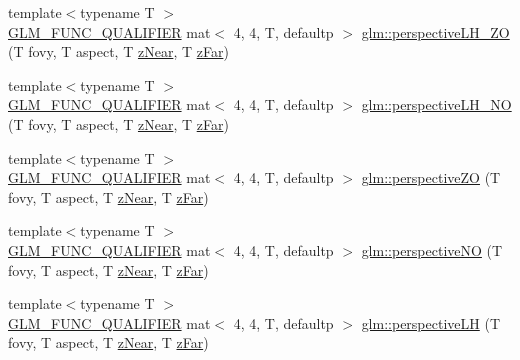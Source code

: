 \begin{DoxyCompactItemize}
\item 
{\footnotesize template$<$typename T $>$ }\\\mbox{\hyperlink{setup_8hpp_a33fdea6f91c5f834105f7415e2a64407}{G\+L\+M\+\_\+\+F\+U\+N\+C\+\_\+\+Q\+U\+A\+L\+I\+F\+I\+ER}} mat$<$ 4, 4, T, defaultp $>$ \mbox{\hyperlink{group__gtc__matrix__transform_gaca32af88c2719005c02817ad1142986c}{glm\+::perspective\+L\+H\+\_\+\+ZO}} (T fovy, T aspect, T \mbox{\hyperlink{_s_d_l__opengl__glext_8h_a12d99226e590bbaaf0be69169eeb4834}{z\+Near}}, T \mbox{\hyperlink{_s_d_l__opengl__glext_8h_a1052a8235df129542aea6da80fbec6a1}{z\+Far}})
\item 
{\footnotesize template$<$typename T $>$ }\\\mbox{\hyperlink{setup_8hpp_a33fdea6f91c5f834105f7415e2a64407}{G\+L\+M\+\_\+\+F\+U\+N\+C\+\_\+\+Q\+U\+A\+L\+I\+F\+I\+ER}} mat$<$ 4, 4, T, defaultp $>$ \mbox{\hyperlink{group__gtc__matrix__transform_gaead4d049d1feab463b700b5641aa590e}{glm\+::perspective\+L\+H\+\_\+\+NO}} (T fovy, T aspect, T \mbox{\hyperlink{_s_d_l__opengl__glext_8h_a12d99226e590bbaaf0be69169eeb4834}{z\+Near}}, T \mbox{\hyperlink{_s_d_l__opengl__glext_8h_a1052a8235df129542aea6da80fbec6a1}{z\+Far}})
\item 
{\footnotesize template$<$typename T $>$ }\\\mbox{\hyperlink{setup_8hpp_a33fdea6f91c5f834105f7415e2a64407}{G\+L\+M\+\_\+\+F\+U\+N\+C\+\_\+\+Q\+U\+A\+L\+I\+F\+I\+ER}} mat$<$ 4, 4, T, defaultp $>$ \mbox{\hyperlink{group__gtc__matrix__transform_gaa9dfba5c2322da54f72b1eb7c7c11b47}{glm\+::perspective\+ZO}} (T fovy, T aspect, T \mbox{\hyperlink{_s_d_l__opengl__glext_8h_a12d99226e590bbaaf0be69169eeb4834}{z\+Near}}, T \mbox{\hyperlink{_s_d_l__opengl__glext_8h_a1052a8235df129542aea6da80fbec6a1}{z\+Far}})
\item 
{\footnotesize template$<$typename T $>$ }\\\mbox{\hyperlink{setup_8hpp_a33fdea6f91c5f834105f7415e2a64407}{G\+L\+M\+\_\+\+F\+U\+N\+C\+\_\+\+Q\+U\+A\+L\+I\+F\+I\+ER}} mat$<$ 4, 4, T, defaultp $>$ \mbox{\hyperlink{group__gtc__matrix__transform_gaf497e6bca61e7c87088370b126a93758}{glm\+::perspective\+NO}} (T fovy, T aspect, T \mbox{\hyperlink{_s_d_l__opengl__glext_8h_a12d99226e590bbaaf0be69169eeb4834}{z\+Near}}, T \mbox{\hyperlink{_s_d_l__opengl__glext_8h_a1052a8235df129542aea6da80fbec6a1}{z\+Far}})
\item 
{\footnotesize template$<$typename T $>$ }\\\mbox{\hyperlink{setup_8hpp_a33fdea6f91c5f834105f7415e2a64407}{G\+L\+M\+\_\+\+F\+U\+N\+C\+\_\+\+Q\+U\+A\+L\+I\+F\+I\+ER}} mat$<$ 4, 4, T, defaultp $>$ \mbox{\hyperlink{group__gtc__matrix__transform_ga9bd34951dc7022ac256fcb51d7f6fc2f}{glm\+::perspective\+LH}} (T fovy, T aspect, T \mbox{\hyperlink{_s_d_l__opengl__glext_8h_a12d99226e590bbaaf0be69169eeb4834}{z\+Near}}, T \mbox{\hyperlink{_s_d_l__opengl__glext_8h_a1052a8235df129542aea6da80fbec6a1}{z\+Far}})

\end{DoxyCompactItemize}
